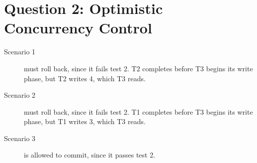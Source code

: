 \section{Question 2: Optimistic Concurrency Control}

\begin{description}
\item[Scenario 1] must roll back, since it fails test 2. T2 completes before T3 begins its write phase, but T2 writes 4, which T3 reads.
\item[Scenario 2] must roll back, since it fails test 2. T1 completes before T3 begins its write phase, but T1 writes 3, which T3 reads.
\item[Scenario 3] is allowed to commit, since it passes test 2.
\end{description}
